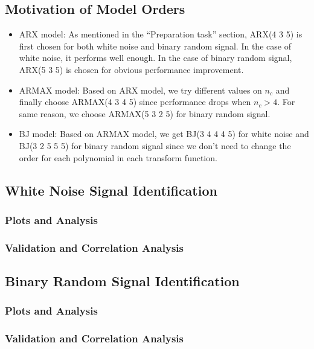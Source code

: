 \documentclass[10pt,a4paper]{article}
\begin{document}
\subsection{Motivation of Model Orders}
\begin{itemize}
\item ARX model: As mentioned in the ``Preparation task'' section, ARX(4 3 5) is first chosen for both white noise and binary random signal. In the case of white noise, it performs well enough. In the case of binary random signal, ARX(5 3 5) is chosen for obvious performance improvement.
\item ARMAX model: Based on ARX model, we try different values on $n_{c}$ and finally choose ARMAX(4 3 4 5) since performance drops when $n_{c} > 4$. For same reason, we choose ARMAX(5 3 2 5) for binary random signal.
\item BJ model: Based on ARMAX model, we get BJ(3 4 4 4 5) for white noise and BJ(3 2 5 5 5) for binary random signal since we don't need to change the order for each polynomial in each transform function.
\end{itemize}
\subsection{White Noise Signal Identification}

\subsubsection{Plots and Analysis} %
\subsubsection{Validation and Correlation Analysis}
\subsection{Binary Random Signal Identification}
\subsubsection{Plots and Analysis} %
\subsubsection{Validation and Correlation Analysis}
\end{document}
